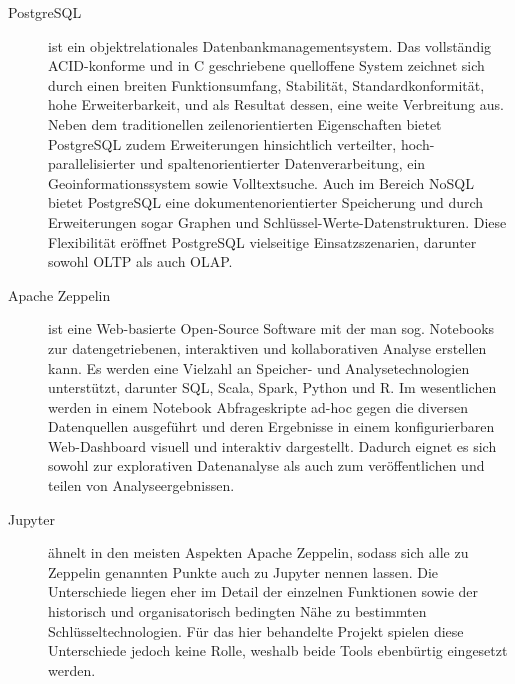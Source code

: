 \begin{description}
	\item [PostgreSQL] ist ein objektrelationales Datenbankmanagementsystem. Das vollständig ACID-konforme und in C geschriebene quelloffene System zeichnet sich durch einen breiten Funktionsumfang, Stabilität, Standardkonformität, hohe Erweiterbarkeit, und als Resultat dessen, eine weite Verbreitung aus. Neben dem traditionellen zeilenorientierten  Eigenschaften bietet PostgreSQL zudem Erweiterungen hinsichtlich verteilter, hoch-parallelisierter und  spaltenorientierter Datenverarbeitung, ein Geoinformationssystem sowie Volltextsuche. Auch im Bereich NoSQL bietet PostgreSQL eine dokumentenorientierter Speicherung und durch Erweiterungen sogar Graphen und Schlüssel-Werte-Datenstrukturen. Diese Flexibilität eröffnet PostgreSQL vielseitige Einsatzszenarien, darunter sowohl OLTP als auch OLAP.
	\item [Apache Zeppelin] ist eine Web-basierte Open-Source Software mit der man sog. Notebooks zur datengetriebenen, interaktiven und kollaborativen Analyse erstellen kann. Es werden eine Vielzahl an Speicher- und Analysetechnologien unterstützt, darunter SQL, Scala, Spark, Python und R. Im wesentlichen werden in einem Notebook Abfrageskripte ad-hoc gegen die diversen Datenquellen ausgeführt und deren Ergebnisse in einem konfigurierbaren Web-Dashboard visuell und interaktiv dargestellt. Dadurch eignet es sich sowohl zur explorativen Datenanalyse als auch zum veröffentlichen und teilen von Analyseergebnissen.
	\item [Jupyter] ähnelt in den meisten Aspekten Apache Zeppelin, sodass sich alle zu Zeppelin genannten Punkte auch zu Jupyter nennen lassen. Die Unterschiede liegen eher im Detail der einzelnen Funktionen sowie der historisch und organisatorisch bedingten Nähe zu bestimmten Schlüsseltechnologien. Für das hier behandelte Projekt spielen diese Unterschiede jedoch keine Rolle, weshalb beide Tools ebenbürtig eingesetzt werden.
\end{description}